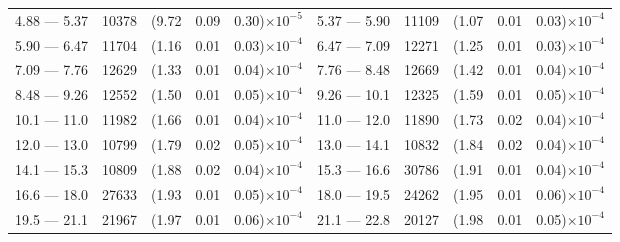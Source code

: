 \begin{table}[p]
\begin{tabular}{c|c|ccc  c|c|ccc}
4.88 — 5.37  &  10378                &(9.72                                &  0.09                   &      0.30)$\times 10^{-5}$  & 5.37 — 5.90  &  11109                 &(1.07                                &  0.01                   &      0.03)$\times 10^{-4}$ \\
5.90 — 6.47  &  11704                &(1.16                                &  0.01                   &      0.03)$\times 10^{-4}$  & 6.47 — 7.09  &  12271                 &(1.25                                &  0.01                   &      0.03)$\times 10^{-4}$ \\
7.09 — 7.76  &  12629                &(1.33                                &  0.01                   &      0.04)$\times 10^{-4}$  & 7.76 — 8.48  &  12669                 &(1.42                                &  0.01                   &      0.04)$\times 10^{-4}$ \\
8.48 — 9.26  &  12552                &(1.50                                &  0.01                   &      0.05)$\times 10^{-4}$  & 9.26 — 10.1  &  12325                 &(1.59                                &  0.01                   &      0.05)$\times 10^{-4}$ \\
10.1 — 11.0  &  11982                 &(1.66                                &  0.01                   &      0.04)$\times 10^{-4}$  & 11.0 — 12.0  &  11890                 &(1.73                                &  0.02                   &      0.04)$\times 10^{-4}$ \\
12.0 — 13.0  &  10799                &(1.79                                &  0.02                   &      0.05)$\times 10^{-4}$  & 13.0 — 14.1  &  10832                 &(1.84                                &  0.02                   &      0.04)$\times 10^{-4}$ \\
14.1 — 15.3  &  10809                &(1.88                                &  0.02                   &      0.04)$\times 10^{-4}$  & 15.3 — 16.6  &  30786                 &(1.91                                &  0.01                   &      0.04)$\times 10^{-4}$ \\
16.6 — 18.0  &  27633                &(1.93                                &  0.01                   &      0.05)$\times 10^{-4}$  & 18.0 — 19.5  &  24262                 &(1.95                                &  0.01                   &      0.06)$\times 10^{-4}$ \\
19.5 — 21.1  &  21967                &(1.97                                &  0.01                   &      0.06)$\times 10^{-4}$  & 21.1 — 22.8  &  20127                 &(1.98                                &  0.01                   &      0.05)$\times 10^{-4}$ \\

\end{tabular}
\end{table}
